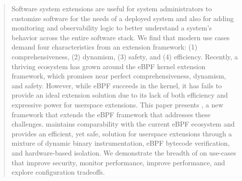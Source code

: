 \begin{abstract}
Software system extensions are useful for system administrators to customize software for the needs of a deployed system and also for adding monitoring and observability logic to better understand a system’s behavior across the entire software stack.  We find that modern use cases demand four characteristics from an extension framework: (1) comprehensiveness, (2) dynamism, (3) safety, and (4) efficiency.  Recently, a thriving ecosystem has grown around the eBPF kernel extension framework, which promises near perfect comprehensiveness, dynamism, and safety.  However, while eBPF succeeds in the kernel, it has fails to provide an ideal extension solution due to its lack of both efficiency and expressive power for userspace extensions. This paper presents \sys{}, a new framework that extends the eBPF framework that addresses these challenges.  \sys{} maintains comparability with the current eBPF ecosystem and provides an efficient, yet safe, solution for userspace extensions through a mixture of dynamic binary instrumentation, eBPF bytecode verification, and hardware-based isolation.  We demonstrate the breadth of \sys{} on \numcases{} use-cases that improve security, monitor performance, improve performance, and explore configuration tradeoffs.
\end{abstract}



